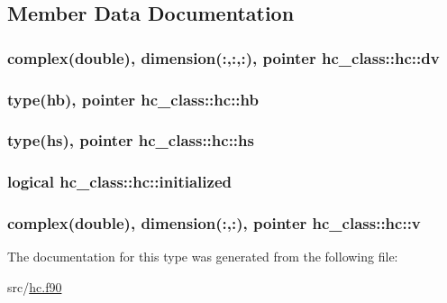 \subsection{Member Data Documentation}
\hypertarget{structhc__class_1_1hc_ae44fb8b1351b045650148c174099a1a1}{
\subsubsection[{dv}]{\setlength{\rightskip}{0pt plus 5cm}complex(double), dimension(\+:,\+:,\+:), pointer hc\+\_\+class\+::hc\+::dv\hspace{0.3cm}{\ttfamily [private]}}}\label{structhc__class_1_1hc_ae44fb8b1351b045650148c174099a1a1}
\hypertarget{structhc__class_1_1hc_a87af1d9489543e7f6a7501ea8468f763}{
\subsubsection[{hb}]{\setlength{\rightskip}{0pt plus 5cm}type(hb), pointer hc\+\_\+class\+::hc\+::hb\hspace{0.3cm}{\ttfamily [private]}}}\label{structhc__class_1_1hc_a87af1d9489543e7f6a7501ea8468f763}
\hypertarget{structhc__class_1_1hc_a09dd08ce79ada0e7a9f7c3eb8a2a50f5}{
\subsubsection[{hs}]{\setlength{\rightskip}{0pt plus 5cm}type(hs), pointer hc\+\_\+class\+::hc\+::hs\hspace{0.3cm}{\ttfamily [private]}}}\label{structhc__class_1_1hc_a09dd08ce79ada0e7a9f7c3eb8a2a50f5}
\hypertarget{structhc__class_1_1hc_a89151c80172cb67d68a44b6264afb8a7}{
\subsubsection[{initialized}]{\setlength{\rightskip}{0pt plus 5cm}logical hc\+\_\+class\+::hc\+::initialized\hspace{0.3cm}{\ttfamily [private]}}}\label{structhc__class_1_1hc_a89151c80172cb67d68a44b6264afb8a7}
\hypertarget{structhc__class_1_1hc_ad3bab6b18bd729b4e1c49f7d14c0b4f9}{
\subsubsection[{v}]{\setlength{\rightskip}{0pt plus 5cm}complex(double), dimension(\+:,\+:), pointer hc\+\_\+class\+::hc\+::v\hspace{0.3cm}{\ttfamily [private]}}}\label{structhc__class_1_1hc_ad3bab6b18bd729b4e1c49f7d14c0b4f9}


The documentation for this type was generated from the following file\+:\begin{DoxyCompactItemize}
\item 
src/\hyperlink{hc_8f90}{hc.\+f90}\end{DoxyCompactItemize}
